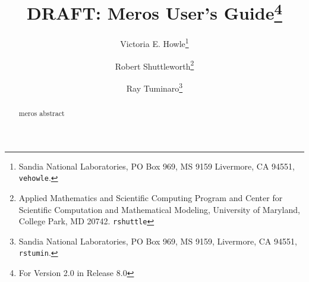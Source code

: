 \documentclass[oneeqnum,onefignum,onetabnum,10pt]{SANDreport}
\title{DRAFT: Meros User's Guide\footnote{For \MerosTM{} Version 2.0 in
\TrilinosTM{} Release 8.0}}
\author{
Victoria E. Howle\thanks{Sandia National Laboratories, PO Box 969, MS 9159
    Livermore, CA 94551, {\tt vehowle}\protect@{\tt sandia.gov}.}
  \and
  Robert Shuttleworth\thanks{Applied Mathematics and Scientific Computing Program and Center for Scientific
Computation and Mathematical Modeling,
University of Maryland, College Park, MD 20742. {\tt rshuttle}\protect@{\tt math.umd.edu}}
  \and
  Ray Tuminaro\thanks{Sandia National Laboratories, PO Box 969, MS 9159,
    Livermore, CA 94551, {\tt rstumin}\protect@{\tt sandia.gov}.}
}
\date{}
\begin{document}
\maketitle
\begin{abstract}
meros abstract
\end{abstract}






\SANDmain

\clearpage
\tableofcontents




%





\appendix




    
%
\end{document}
